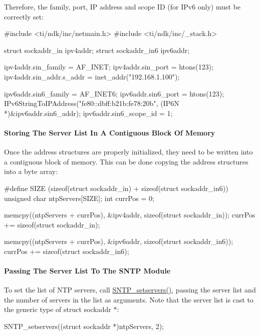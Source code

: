 Therefore, the family, port, I\+P address and scope I\+D (for I\+Pv6 only) must be correctly set\+: 
\begin{DoxyCode}
\textcolor{preprocessor}{#include <ti/ndk/inc/netmain.h>}
\textcolor{preprocessor}{#include <ti/ndk/inc/\_stack.h>}

\textcolor{keyword}{struct }sockaddr\_in  ipv4addr;
\textcolor{keyword}{struct }sockaddr\_in6 ipv6addr;

ipv4addr.sin\_family = AF\_INET;
ipv4addr.sin\_port = htons(123);
ipv4addr.sin\_addr.s\_addr = inet\_addr(\textcolor{stringliteral}{"192.168.1.100"});

ipv6addr.sin6\_family = AF\_INET6;
ipv6addr.sin6\_port = htons(123);
IPv6StringToIPAddress(\textcolor{stringliteral}{"fe80::dbff:b21b:fe78:20b"},
        (IP6N *)&ipv6addr.sin6\_addr);
ipv6addr.sin6\_scope\_id = 1;
\end{DoxyCode}


\paragraph*{Storing The Server List In A Contiguous Block Of Memory}

Once the address structures are properly initialized, they need to be written into a contiguous block of memory. This can be done copying the address structures into a byte array\+: 
\begin{DoxyCode}
\textcolor{preprocessor}{#define SIZE (sizeof(struct sockaddr\_in) + sizeof(struct sockaddr\_in6))}
\textcolor{keywordtype}{unsigned} \textcolor{keywordtype}{char} ntpServers[SIZE];
\textcolor{keywordtype}{int} currPos = 0;

memcpy((ntpServers + currPos), &ipv4addr, \textcolor{keyword}{sizeof}(\textcolor{keyword}{struct} sockaddr\_in));
currPos += \textcolor{keyword}{sizeof}(\textcolor{keyword}{struct }sockaddr\_in);

memcpy((ntpServers + currPos), &ipv6addr, \textcolor{keyword}{sizeof}(\textcolor{keyword}{struct} sockaddr\_in6));
currPos += \textcolor{keyword}{sizeof}(\textcolor{keyword}{struct }sockaddr\_in6);
\end{DoxyCode}


\paragraph*{Passing The Server List To The S\+N\+T\+P Module}

To set the list of N\+T\+P servers, call \hyperlink{sntp_8h_a34409ecc254ee5abf525c69909d3df59}{S\+N\+T\+P\+\_\+setservers()}, passing the server list and the number of servers in the list as arguments. Note that the server list is cast to the generic type of \textquotesingle{}struct sockaddr $\ast$\textquotesingle{}\+: 
\begin{DoxyCode}
SNTP_setservers((\textcolor{keyword}{struct} sockaddr *)ntpServers, 2);
\end{DoxyCode}


